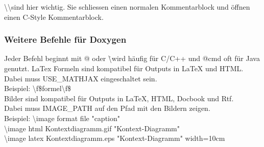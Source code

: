 
\textbackslash \textbackslash  sind hier wichtig. Sie schliessen einen normalen Kommentarblock und öffnen einen C-Style Kommentarblock. 

\subsubsection{Weitere Befehle für Doxygen}

Jeder Befehl beginnt mit @ oder \. \textbackslash wird häufig für C/C++ und @cmd oft für Java genutzt. 
LaTex Formeln sind kompatibel für Outputs in LaTeX und HTML. \\
Dabei muss USE\_MATHJAX eingeschaltet sein. \\
Beispiel: \textbackslash f\$formel\textbackslash f\$\\
Bilder sind kompatibel für Outputs in LaTeX, HTML, Docbook und Rtf. \\
Dabei muss IMAGE\_PATH auf den Pfad mit den Bildern zeigen. \\
Beispiel:  \textbackslash image format file "caption" \\
\textbackslash image html Kontextdiagramm.gif "Kontext-Diagramm" \\
\textbackslash image latex Kontextdiagramm.eps "Kontext-Diagramm" width=10cm \\
